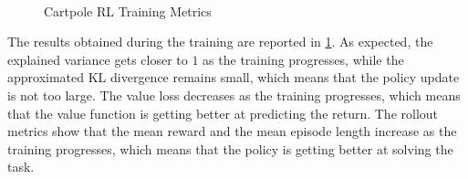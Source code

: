 \begin{figure}
    \centering
    \caption{Cartpole RL Training Metrics}
    \label{fig:cartpoleresults}
     \\
\end{figure}

The results obtained during the training are reported in \cref{fig:cartpoleresults}. As expected, the explained variance gets closer to $1$ as the training progresses, while the approximated KL divergence remains small, which means that the policy update is not too large. The value loss decreases as the training progresses, which means that the value function is getting better at predicting the return. The rollout metrics show that the mean reward and the mean episode length increase as the training progresses, which means that the policy is getting better at solving the task.

